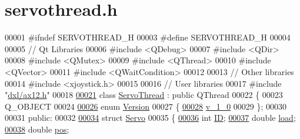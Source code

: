 \hypertarget{servothread_8h_source}{}\section{servothread.\+h}

\begin{DoxyCode}
00001 \textcolor{preprocessor}{#ifndef SERVOTHREAD\_H}
00003 \textcolor{preprocessor}{#define SERVOTHREAD\_H}
00004 
00005 \textcolor{comment}{// Qt Libraries}
00006 \textcolor{preprocessor}{#include <QDebug>}
00007 \textcolor{preprocessor}{#include <QDir>}
00008 \textcolor{preprocessor}{#include <QMutex>}
00009 \textcolor{preprocessor}{#include <QThread>}
00010 \textcolor{preprocessor}{#include <QVector>}
00011 \textcolor{preprocessor}{#include <QWaitCondition>}
00012 
00013 \textcolor{comment}{// Other libraries}
00014 \textcolor{preprocessor}{#include <xjoystick.h>}
00015 
00016 \textcolor{comment}{// User libraries}
00017 \textcolor{preprocessor}{#include "\hyperlink{ax12_8h}{dxl/ax12.h}"}
00018 
\hypertarget{servothread_8h_source_l00021}{}\hyperlink{class_servo_thread}{00021} \textcolor{keyword}{class }\hyperlink{class_servo_thread}{ServoThread} : \textcolor{keyword}{public} QThread
00022 \{
00023     Q\_OBJECT
00024     
\hypertarget{servothread_8h_source_l00026}{}\hyperlink{class_servo_thread_aeccce0ac6a969e2ee7cbe91687e2d085}{00026}     \textcolor{keyword}{enum} \hyperlink{class_servo_thread_aeccce0ac6a969e2ee7cbe91687e2d085}{Version} 
00027     \{
\hypertarget{servothread_8h_source_l00028}{}\hyperlink{class_servo_thread_aeccce0ac6a969e2ee7cbe91687e2d085a319b6bf2cb120faeefbd0a5118ece7e3}{00028}         \hyperlink{class_servo_thread_aeccce0ac6a969e2ee7cbe91687e2d085a319b6bf2cb120faeefbd0a5118ece7e3}{v\_1\_0}
00029     \};
00030     
00031 \textcolor{keyword}{public}:
00032     
\hypertarget{servothread_8h_source_l00034}{}\hyperlink{struct_servo_thread_1_1_servo}{00034}     \textcolor{keyword}{struct }\hyperlink{struct_servo_thread_1_1_servo}{Servo} 
00035     \{
\hypertarget{servothread_8h_source_l00036}{}\hyperlink{struct_servo_thread_1_1_servo_a06b514c42113aa85fd1703fc88fca7ce}{00036}         \textcolor{keywordtype}{int} \hyperlink{struct_servo_thread_1_1_servo_a06b514c42113aa85fd1703fc88fca7ce}{ID};         
\hypertarget{servothread_8h_source_l00037}{}\hyperlink{struct_servo_thread_1_1_servo_ae378d77acf16b306649c87fdb8df677e}{00037}         \textcolor{keywordtype}{double} \hyperlink{struct_servo_thread_1_1_servo_ae378d77acf16b306649c87fdb8df677e}{load};    
\hypertarget{servothread_8h_source_l00038}{}\hyperlink{struct_servo_thread_1_1_servo_a9fa0aa56944b9b0bb9d66303d5bd4b59}{00038}         \textcolor{keywordtype}{double} \hyperlink{struct_servo_thread_1_1_servo_a9fa0aa56944b9b0bb9d66303d5bd4b59}{pos};     

\end{DoxyCode}
